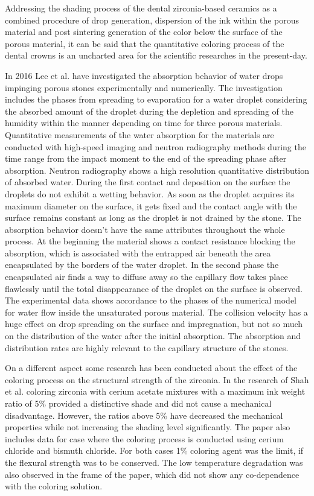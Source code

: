 Addressing the shading process of the dental zirconia-based ceramics as a combined procedure of drop generation, dispersion of the ink within the porous material and post sintering generation of the color below the surface of the porous material, it can be said that the quantitative coloring process of the dental crowns is an uncharted area for the scientific researches in the present-day. 


In 2016 Lee et al. have investigated the absorption behavior of water drops impinging porous stones experimentally and numerically. The investigation includes the phases from spreading to evaporation for a water droplet considering the absorbed amount of the droplet during the depletion and spreading of the humidity within the manner depending on time for three porous materials. Quantitative measurements of the water absorption for the materials are conducted with high-speed imaging and neutron radiography methods during the time range from the impact moment to the end of the spreading phase after absorption. Neutron radiography shows a high resolution quantitative distribution of absorbed water. During the first contact and deposition on the surface the droplets do not exhibit a wetting behavior.  As soon as the droplet acquires its maximum diameter on the surface, it gets fixed and the contact angle with the surface remains constant as long as the droplet is not drained by the stone. The absorption behavior doesn’t have the same attributes throughout the whole process. At the beginning the material shows a contact resistance blocking the absorption, which is associated with the entrapped air beneath the area encapsulated by the borders of the water droplet. In the second phase the encapsulated air finds a way to diffuse away so the capillary flow takes place flawlessly until the total disappearance of the droplet on the surface is observed. The experimental data shows accordance to the phases of the numerical model for water flow inside the unsaturated porous material. The collision velocity has a huge effect on drop spreading on the surface and impregnation, but not so much on the distribution of the water after the initial absorption. The absorption and distribution rates are highly relevant to the capillary structure of the stones.\citep{lee2016absorption}

On a different aspect some research has been conducted about the effect of the coloring process on the structural strength of the zirconia. In the research of Shah et al. coloring zirconia with cerium acetate mixtures with a maximum ink weight ratio of 5\% provided a distinctive shade and did not cause a mechanical disadvantage. However, the ratios above 5\% have decreased the mechanical properties while not increasing the shading level significantly. The paper also includes data for case where the coloring process is conducted using cerium chloride and bismuth chloride. For both cases 1\% coloring agent was the limit, if the flexural strength was to be conserved. The low temperature degradation was also observed in the frame of the paper, which did not show any co-dependence with the coloring solution.\citep{shah2008effect}


